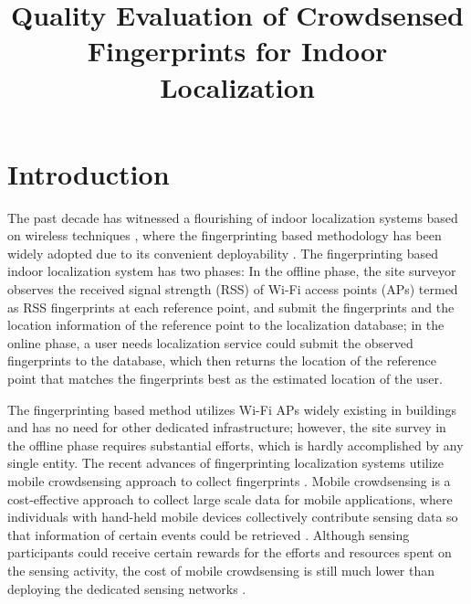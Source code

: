 \documentclass[10pt,conference,compsocconf,letterpaper]{IEEEtran}
\begin{document}
\title{Quality Evaluation of Crowdsensed Fingerprints for Indoor Localization}

%
%

\maketitle



\begin{abstract}

\end{abstract}


\section{Introduction}\label{sectionintro}
The past decade has witnessed a flourishing of indoor localization systems based on wireless techniques \cite{ rsscsi}, where the fingerprinting based methodology has been widely adopted due to its convenient deployability \cite{ mobicom04, horus }. The fingerprinting based indoor localization system has two phases: In the offline phase, the site surveyor observes the received signal strength (RSS) of Wi-Fi access points (APs) termed as RSS fingerprints at each reference point, and submit the fingerprints and the location information of the reference point to the localization database; in the online phase, a user needs localization service could submit the observed fingerprints to the database, which then returns the location of the reference point that matches the fingerprints best as the estimated location of the user.   

The fingerprinting based method utilizes Wi-Fi APs widely existing in buildings and has no need for other dedicated infrastructure; however, the site survey in the offline phase requires substantial efforts, which is hardly accomplished by any single entity. The recent advances of fingerprinting localization systems utilize mobile crowdsensing approach to collect fingerprints \cite{ wen2015fundamental, Chenshu14, luo2014piloc, shen2013walkie, ez10, Chintalapudi10}. Mobile crowdsensing is a cost-effective approach to collect large scale data for mobile applications, where individuals with hand-held mobile devices collectively contribute sensing data so that information of certain events could be retrieved \cite{crowdsensing, postedpricing}. Although sensing participants could receive certain rewards for the efforts and resources spent on the sensing activity, the cost of mobile crowdsensing is still much lower than deploying the dedicated sensing networks \cite{ crowdsensing}. 
\end{document}
